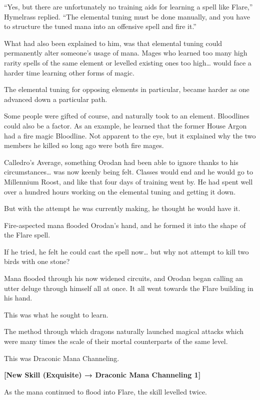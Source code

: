 \documentclass[a4paper,10pt]{book}
\begin{document}
“Yes, but there are unfortunately no training aids for learning a spell like Flare,” Hymelrass replied. “The elemental tuning must be done manually, and you have to structure the tuned mana into an offensive spell and fire it.”\par
What had also been explained to him, was that elemental tuning could permanently alter someone’s usage of mana. Mages who learned too many high rarity spells of the same element or levelled existing ones too high… would face a harder time learning other forms of magic.\par
The elemental tuning for opposing elements in particular, became harder as one advanced down a particular path.\par
Some people were gifted of course, and naturally took to an element. Bloodlines could also be a factor. As an example, he learned that the former House Argon had a fire magic Bloodline. Not apparent to the eye, but it explained why the two members he killed so long ago were both fire mages.\par
Calledro’s Average, something Orodan had been able to ignore thanks to his circumstances… was now keenly being felt. Classes would end and he would go to Millennium Roost, and like that four days of training went by. He had spent well over a hundred hours working on the elemental tuning and getting it down.\par
But with the attempt he was currently making, he thought he would have it.\par
Fire-aspected mana flooded Orodan’s hand, and he formed it into the shape of the Flare spell.\par
If he tried, he felt he could cast the spell now… but why not attempt to kill two birds with one stone?\par
Mana flooded through his now widened circuits, and Orodan began calling an utter deluge through himself all at once. It all went towards the Flare building in his hand.\par
This was what he sought to learn.\par
The method through which dragons naturally launched magical attacks which were many times the scale of their mortal counterparts of the same level.\par
This was Draconic Mana Channeling.\par
\textbf{[New Skill (Exquisite) → Draconic Mana Channeling 1]}\par
As the mana continued to flood into Flare, the skill levelled twice.\par
\end{document}
